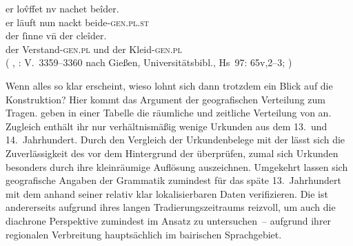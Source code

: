 \begin{exe}
\ex \label{ex:gendatconj}
	\begin{xlist}
	\ex \label{ex:gendatconj_1}
		\gll er lov̂ffet nv nachet beîder. \\
			er läuft nun nackt beide-\textsc{gen.pl.st} \\
	\sn \gll der ſinne vn̄ der cleîder. \\
			der Verstand-\textsc{gen.pl} und der
				Kleid-\textsc{gen.pl} \\
		\trans {}
			(%
				, : V.~3359--3360 nach
				Gießen, Universitätsbibl., Hs~97: 65v,2--3;
				\cite[vgl.][500]{mertens2004}%
			)

	\end{xlist}
\end{exe}
%

Wenn alles so klar erscheint, wieso lohnt sich dann trotzdem ein Blick auf die
Konstruktion? Hier kommt das Argument der geografischen
Verteilung zum Tragen. \citet[627]{ksw2} geben in
einer Tabelle die räumliche und zeitliche Verteilung
von  an. Zugleich enthält ihr  nur verhältnismäßig
wenige Urkunden aus dem 13.\ und 14.\ Jahrhundert. Durch den
Vergleich der Urkundenbelege mit der  lässt
sich die Zuverlässigkeit des \CAO{} vor dem Hintergrund der
 überprüfen, zumal sich Urkunden besonders durch ihre
kleinräumige Auflösung auszeichnen. Umgekehrt lassen sich geografische Angaben
der Grammatik zumindest für das späte 13.~Jahrhundert mit dem \CAO{} anhand
seiner relativ klar lokalisierbaren Daten verifizieren. Die \KC{} ist
andererseits aufgrund ihres langen Tradierungs\-zeitraums reizvoll, um auch die
diachrone Perspektive zumindest im Ansatz zu untersuchen~-- aufgrund ihrer
regionalen Verbreitung hauptsächlich im bairischen Sprachgebiet.

